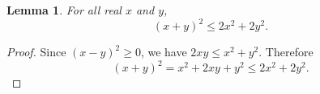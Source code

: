 \documentclass{article}
\newtheorem{lemma}{Lemma}
\begin{document}
\begin{lemma}\label{lem:square}
For all real $x$ and $y$,
\[
(x+y)^2 \le 2x^2+2y^2.
\]
\end{lemma}
\begin{proof}
Since $(x-y)^2\ge0$, we have $2xy\le x^2+y^2$. Therefore
\[
(x+y)^2=x^2+2xy+y^2\le2x^2+2y^2.
\]
\end{proof}
\end{document}
